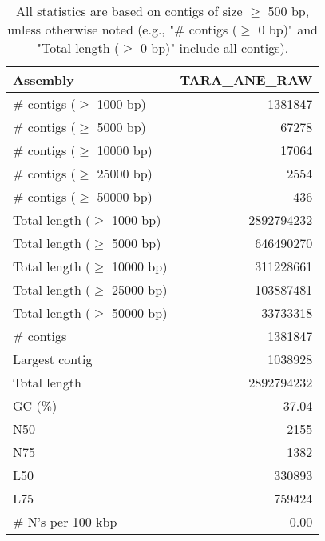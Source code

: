 \documentclass[12pt,a4paper]{article}
\begin{document}
\begin{table}[ht]
\begin{center}
\caption{All statistics are based on contigs of size $\geq$ 500 bp, unless otherwise noted (e.g., "\# contigs ($\geq$ 0 bp)" and "Total length ($\geq$ 0 bp)" include all contigs).}
\begin{tabular}{|l*{1}{|r}|}
\hline
Assembly & TARA\_ANE\_RAW \\ \hline
\# contigs ($\geq$ 1000 bp) & 1381847 \\ \hline
\# contigs ($\geq$ 5000 bp) & 67278 \\ \hline
\# contigs ($\geq$ 10000 bp) & 17064 \\ \hline
\# contigs ($\geq$ 25000 bp) & 2554 \\ \hline
\# contigs ($\geq$ 50000 bp) & 436 \\ \hline
Total length ($\geq$ 1000 bp) & 2892794232 \\ \hline
Total length ($\geq$ 5000 bp) & 646490270 \\ \hline
Total length ($\geq$ 10000 bp) & 311228661 \\ \hline
Total length ($\geq$ 25000 bp) & 103887481 \\ \hline
Total length ($\geq$ 50000 bp) & 33733318 \\ \hline
\# contigs & 1381847 \\ \hline
Largest contig & 1038928 \\ \hline
Total length & 2892794232 \\ \hline
GC (\%) & 37.04 \\ \hline
N50 & 2155 \\ \hline
N75 & 1382 \\ \hline
L50 & 330893 \\ \hline
L75 & 759424 \\ \hline
\# N's per 100 kbp & 0.00 \\ \hline
\end{tabular}
\end{center}
\end{table}
\end{document}
